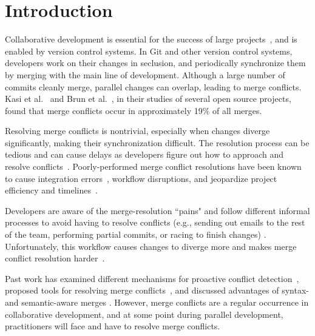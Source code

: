 

\section{Introduction}\label{introduction}

Collaborative development is essential for the success of large projects~\cite{hattori2010syde}, and is enabled by version control systems. 
In Git and other version control systems, developers work on their changes in seclusion, and periodically synchronize them by merging with the main line of development. 
Although a large number of commits cleanly merge, parallel changes can overlap, leading to merge conflicts. Kasi et al.~\cite{cassandra} and Brun et al.~\cite{Brun2011}, in their studies of several open source projects, found that merge conflicts occur in approximately 19\% of all merges.

Resolving merge conflicts is nontrivial, especially when changes diverge significantly, making their synchronization difficult. 
The resolution process can be tedious and can cause delays as developers figure out how to approach and resolve conflicts~\cite{cassandra}. 
Poorly-performed merge conflict resolutions have been known to cause integration errors~\cite{bird-branches-conflict}, workflow disruptions, and jeopardize project efficiency and timelines~\cite{estler2014awareness}. 

Developers are aware of the merge-resolution ``pains" and follow different informal processes to avoid having to resolve conflicts (e.g., sending out emails to the rest of the team, performing partial commits, or racing to finish changes) \cite{deSouza2003breaking}\cite{cataldo2008distributed_dev}.
Unfortunately, this workflow causes changes to diverge more and makes merge conflict resolution harder~\cite{Brun2011}. 


Past work has examined different mechanisms for proactive conflict detection~\cite{Brun2011}\cite{palantir}\cite{Guimaraes}, proposed tools for resolving merge conflicts~\cite{nishimura}\cite{mens2002state}, and discussed advantages of syntax- and semantic-aware merges \cite{danny_refactorings}\cite{hunt2002extensible}. 
However, merge conflicts are a regular occurrence in collaborative development, and at some point during parallel development, practitioners will face and have to resolve merge conflicts.

